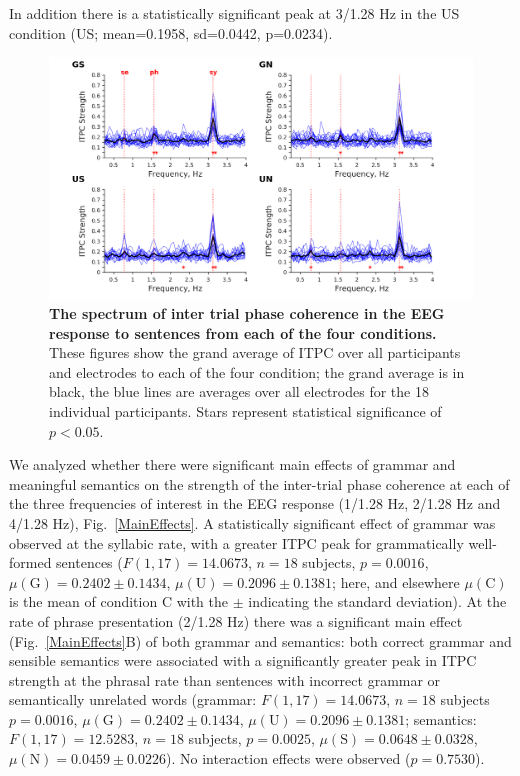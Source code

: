 \documentclass[a4paper,10pt,twoside]{article}
\begin{document}
{In addition there is a statistically significant peak at 3/1.28 Hz in the US condition (US; mean=0.1958, sd=0.0442, p=0.0234).

\begin{figure}[tbp]
\includegraphics[width=\linewidth]{grand_average.png}
\caption{\textbf{The spectrum of inter trial phase coherence in the
    EEG response to sentences from each of the four conditions.} These
  figures show the grand average of ITPC over all participants and
  electrodes to each of the four condition; the grand average is in
  black, the blue lines are averages over all electrodes for the 18
  individual participants. Stars represent statistical significance of
  $p<0.05$.}
\label{Fig1}
\end{figure}

We analyzed whether there were significant main effects of grammar and
meaningful semantics on the strength of the inter-trial phase
coherence at each of the three frequencies of interest in the EEG
response (1/1.28 Hz, 2/1.28 Hz and 4/1.28 Hz),
Fig.~\ref{MainEffects}. A statistically significant effect of grammar
was observed at the syllabic rate, with a greater ITPC peak for
grammatically well-formed sentences ($F(1,17)=14.0673$, $n=18$ subjects,
$p=0.0016$, $\mu(\mathrm{G}) = 0.2402 \pm 0.1434$, $\mu(\mathrm{U}) =
0.2096 \pm 0.1381$; here, and elsewhere $\mu(\mathrm{C})$ is the mean of
condition C with the $\pm$ indicating the standard deviation). At the
rate of phrase presentation (2/1.28 Hz) there was a significant main
effect (Fig.~\ref{MainEffects}B) of both grammar and semantics: both
correct grammar and sensible semantics were associated with a
significantly greater peak in ITPC strength at the phrasal rate than
sentences with incorrect grammar or semantically unrelated words
(grammar: $F(1,17)=14.0673$, $n=18$ subjects $p=0.0016$, $\mu(\mathrm{G})=
0.2402 \pm 0.1434$, $\mu(\mathrm{U})= 0.2096 \pm 0.1381$; semantics:
 $F(1,17)=12.5283$, $n=18$ subjects, $p=0.0025$, $\mu(\mathrm{S}) = 0.0648
\pm 0.0328$, $\mu(\mathrm{N}) = 0.0459 \pm 0.0226$). No interaction
effects were observed ($p=0.7530$).

}
\end{document}
